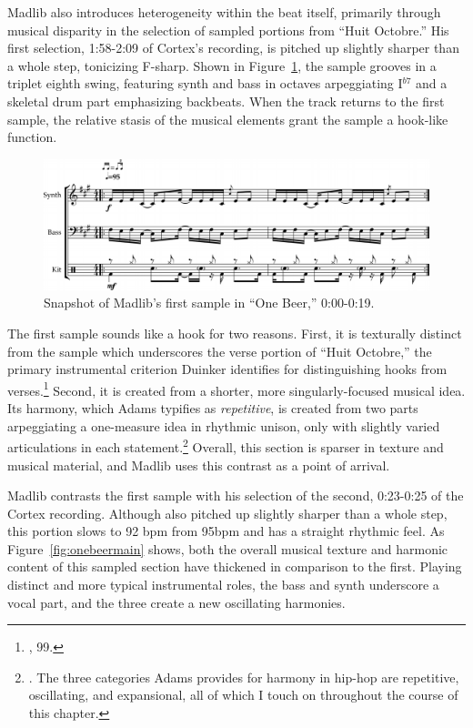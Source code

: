 Madlib also introduces heterogeneity within the beat itself, primarily through musical disparity in the selection of sampled portions from ``Huit Octobre.'' His first selection, 1:58-2:09 of Cortex's recording, is pitched up slightly sharper than a whole step, tonicizing F-sharp. Shown in Figure~\ref{fig:onebeerintro}, the sample grooves in a triplet eighth swing, featuring synth and bass in octaves arpeggiating I$^{b7}$ and a skeletal drum part emphasizing backbeats. When the track returns to the first sample, the relative stasis of the musical elements grant the sample a hook-like function.

    \begin{figure}[ht]
        \centering
        \includegraphics[width=\textwidth]{images/figures/chp 02/000019onebeerintro.pdf}
        \caption{Snapshot of Madlib's first sample in ``One Beer,'' 0:00-0:19.}
        \label{fig:onebeerintro}
    \end{figure}

The first sample sounds like a hook for two reasons. First, it is texturally distinct from the sample which underscores the verse portion of ``Huit Octobre,'' the primary instrumental criterion Duinker identifies for distinguishing hooks from verses.\footnote{\cite{benduinkerSongFormMainstreaming2020}, 99.} Second, it is created from a shorter, more singularly-focused musical idea. Its harmony, which Adams typifies as \emph{repetitive}, is created from two parts arpeggiating a one-measure idea in rhythmic unison, only with slightly varied articulations in each statement.\footnote{\cite{kyleadamsHarmonicSyntacticMotivic2020}. The three categories Adams provides for harmony in hip-hop are repetitive, oscillating, and expansional, all of which I touch on throughout the course of this chapter.} Overall, this section is sparser in texture and musical material, and Madlib uses this contrast as a point of arrival.

Madlib contrasts the first sample with his selection of the second, 0:23-0:25 of the Cortex recording. Although also pitched up slightly sharper than a whole step, this portion slows to 92 bpm from 95bpm and has a straight rhythmic feel. As Figure~\ref{fig:onebeermain} shows, both the overall musical texture and harmonic content of this sampled section have thickened in comparison to the first. Playing distinct and more typical instrumental roles, the bass and synth underscore a vocal part, and the three create a new oscillating harmonies.


